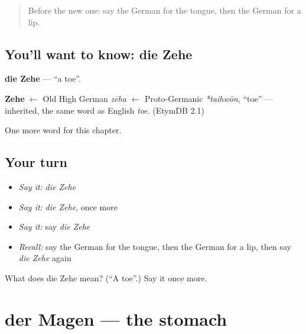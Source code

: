 \label{lesson:GE-C58-zehe}



\begin{quote}
Before the new one: say the German for the tongue, then the German for a lip.
\end{quote}

\subsection*{You'll want to know: die Zehe}
\textbf{die Zehe} — \textquotedblleft{}a toe\textquotedblright{}.

\begin{cousinweb}
\textbf{Zehe} $\leftarrow$ Old High German \emph{zēha} $\leftarrow$ Proto-Germanic \emph{*taihwōn}, \textquotedblleft{}toe\textquotedblright{} — inherited, the same word as English \emph{toe}. (EtymDB 2.1)
\end{cousinweb}

\begin{grammarlens}[title={What you've built}]
One more word for this chapter.
\end{grammarlens}

\subsection*{Your turn}
\begin{itemize}
\raggedright
  \item \emph{Say it:} \emph{die Zehe}
  \item \emph{Say it:} \emph{die Zehe}, once more
  \item \emph{Say it:} say \emph{die Zehe}
  \item \emph{Recall:} say the German for the tongue, then the German for a lip, then say \emph{die Zehe} again
\end{itemize}

\begin{tcolorbox}[breakable,colback=teal!4,colframe=teal!35!black,title={Before you move on}]
What does die Zehe mean? (\textquotedblleft{}A toe\textquotedblright{}.) Say it once more.
\end{tcolorbox}
\section[der Magen]{der Magen — the stomach}

\label{lesson:GE-C58-magen}



